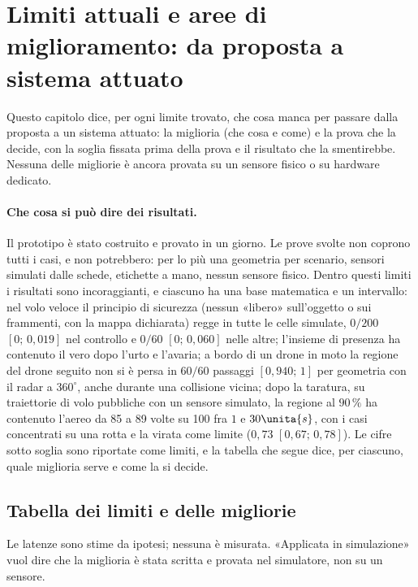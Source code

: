 \section{Limiti attuali e aree di miglioramento: da proposta a sistema attuato}\label{sec:ps}

Questo capitolo dice, per ogni limite trovato, che cosa manca per passare dalla proposta a un sistema attuato: la miglioria (che cosa e come) e la prova che la decide, con la soglia fissata prima della prova e il risultato che la smentirebbe. Nessuna delle migliorie è ancora provata su un sensore fisico o su hardware dedicato.

\paragraph{Che cosa si può dire dei risultati.} Il prototipo è stato costruito e provato in un giorno. Le prove svolte non coprono tutti i casi, e non potrebbero: per lo più una geometria per scenario, sensori simulati dalle schede, etichette a mano, nessun sensore fisico. Dentro questi limiti i risultati sono incoraggianti, e ciascuno ha una base matematica e un intervallo: nel volo veloce il principio di sicurezza (nessun «libero» sull'oggetto o sui frammenti, con la mappa dichiarata) regge in tutte le celle simulate, $0/200$ $[0;\,0{,}019]$ nel controllo e $0/60$ $[0;\,0{,}060]$ nelle altre; l'insieme di presenza ha contenuto il vero dopo l'urto e l'avaria; a bordo di un drone in moto la regione del drone seguito non si è persa in $60/60$ passaggi $[0{,}940;\,1]$ per geometria con il radar a $360^\circ$, anche durante una collisione vicina; dopo la taratura, su traiettorie di volo pubbliche con un sensore simulato, la regione al $90\,\%$ ha contenuto l'aereo da 85 a 89 volte su 100 fra $1$ e $30\unita{s}$, con i casi concentrati su una rotta e la virata come limite ($0{,}73$ $[0{,}67;\,0{,}78]$). Le cifre sotto soglia sono riportate come limiti, e la tabella che segue dice, per ciascuno, quale miglioria serve e come la si decide.

\subsection{Tabella dei limiti e delle migliorie}\label{sec:ps-tabella}

Le latenze sono stime da ipotesi; nessuna è misurata. «Applicata in simulazione» vuol dire che la miglioria è stata scritta e provata nel simulatore, non su un sensore.

